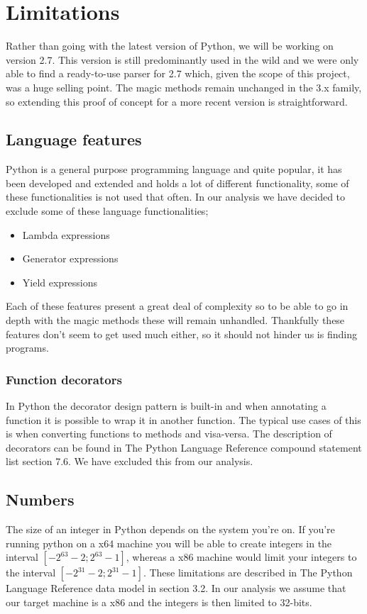 \chapter{Limitations}

Rather than going with the latest version of Python, we will be working on version 2.7. This version is still predominantly used in the wild and we were only able to find a ready-to-use parser for 2.7 which, given the scope of this project, was a huge selling point. The magic methods remain unchanged in the 3.x family, so extending this proof of concept for a more recent version is straightforward.

\section{Language features}
Python is a general purpose programming language and quite popular, it has been developed and extended and holds a lot of different functionality, some of these functionalities is not used that often. In our analysis we have decided to exclude some of these language functionalities;

\begin{itemize}
	\item Lambda expressions
	\item Generator expressions
	\item Yield expressions
\end{itemize}

Each of these features present a great deal of complexity so to be able to go in depth with the magic methods these will remain unhandled. Thankfully these features don't seem to get used much either, so it should not hinder us is finding programs.


\subsection{Function decorators}
In Python the decorator design pattern is built-in and when annotating a function it is possible to wrap it in another function. The typical use cases of this is when converting functions to methods and visa-versa. The description of decorators can be found in The Python Language Reference compound statement list\cite{pyref.compound} section 7.6. We have excluded this from our analysis.

\section{Numbers}
The size of an integer in Python depends on the system you're on. If you're running python on a x64 machine you will be able to create integers in the interval $[-2^{63}-2;2^{63}-1]$, whereas a x86 machine would limit your integers to the interval $[-2^{31}-2;2^{31}-1]$. These limitations are described in The Python Language Reference data model\cite{pyref.datamodel} in section 3.2. In our analysis we assume that our target machine is a x86 and the integers is then limited to 32-bits.

